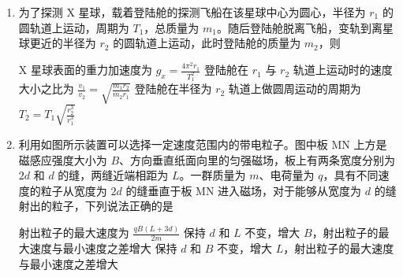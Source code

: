 \documentclass[\gkver]{gaokaozhenti}
\begin{document}
\begin{enumerate}
\item
为了探测 X 星球，载着登陆舱的探测飞船在该星球中心为圆心，半径为 $r_{1}$ 的圆轨道上运动，周期为 $T_{1}$，总质量为 $m_{1}$。随后登陆舱脱离飞船，变轨到离星球更近的半径为 $r_{2}$ 的圆轨道上运动，此时登陆舱的质量为 $m_{2}$，则

{X 星球表面的重力加速度为 $g_{x}=\frac{4\pi^{2}r_{1}}{T_{1}^{2}}$}
{登陆舱在 $r_{1}$ 与 $r_{2}$ 轨道上运动时的速度大小之比为 $\frac{v_{1}}{v_{2}}=\sqrt{\frac{m_{1}r_{2}}{m_{2}r_{1}}}$}
{登陆舱在半径为 $r_{2}$ 轨道上做圆周运动的周期为 $T_{2}=T_{1}\sqrt{\frac{r_{2}^{3}}{r_{1}^{3}}}$}


\item
利用如图所示装置可以选择一定速度范围内的带电粒子。图中板 MN 上方是磁感应强度大小为 $B$、方向垂直纸面向里的匀强磁场，板上有两条宽度分别为 $2d$ 和 $d$ 的缝，两缝近端相距为 $L$。一群质量为 $m$、电荷量为 $q$，具有不同速度的粒子从宽度为 $2d$ 的缝垂直于板 MN 进入磁场，对于能够从宽度为 $d$ 的缝射出的粒子，下列说法正确的是

\onepicture[w=6.00cm]{}

{射出粒子的最大速度为 $\frac{qB(L+3d)}{2m}$}
{保持 $d$ 和 $L$ 不变，增大 $B$，射出粒子的最大速度与最小速度之差增大}
{保持 $d$ 和 $B$ 不变，增大 $L$，射出粒子的最大速度与最小速度之差增大}



\end{enumerate}
\end{document}
